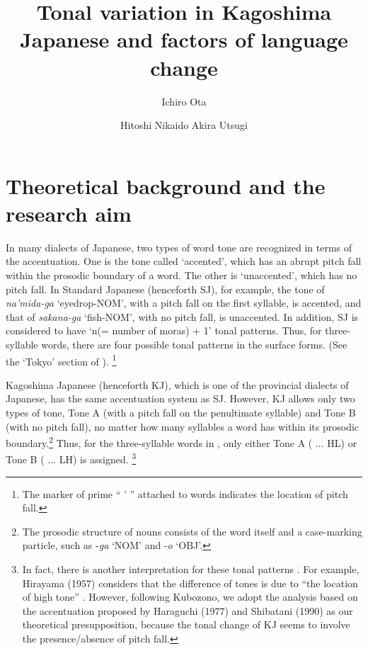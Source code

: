 \documentclass[output=paper]{LSP/langsci}
\author{Ichiro Ota\affiliation{Kagoshima University}\and Hitoshi Nikaido\affiliation{Fukuoka Jo Gakuin University} \lastand Akira Utsugi\affiliation{Nagoya University}}
\title{Tonal variation in {K}agoshima {J}apanese and factors of language change}
\begin{document}
 

\section{Theoretical background and the research aim}
\largerpage[-2]
In many dialects of Japanese, two types of word tone are recognized in terms of the accentuation. One is the tone called `accented', which has an abrupt pitch fall within the prosodic boundary of a word. The other is `unaccented', which has no pitch fall. In Standard Japanese (henceforth SJ), for example, the tone of \textit{na'mida-ga} `eyedrop-NOM', with a pitch fall on the first syllable, is accented, and that of \textit{sakana-ga} `fish-NOM', with no pitch fall, is unaccented. In addition, SJ is considered to have `n(= number of moras) + 1' tonal patterns. Thus, for three-syllable words, there are four possible tonal patterns in the surface forms. (See the `Tokyo' section of ). \footnote{ The marker of prime “ ’ ” attached to words indicates the location of pitch fall.}
 

Kagoshima Japanese (henceforth KJ), which is one of the provincial dialects of Japanese, has the same accentuation system as SJ. However, KJ allows only two types of tone, Tone A (with a pitch fall on the penultimate syllable) and Tone B (with no pitch fall), no matter how many syllables a word has within its prosodic boundary.\footnote{ The prosodic structure of nouns consists of the word itself and a case-marking particle, such as -\textit{ga} `NOM' and -\textit{o} `OBJ'.} Thus, for the three-syllable words in , only either Tone A ( ... HL) or Tone B ( ... LH) is assigned. \footnote{ In fact, there is another interpretation for these tonal patterns \citep{kubozono_tonal_2007}. For example, Hirayama (1957) %
considers that the difference of tones is due to ``the location of high tone'' \citep[327]{kubozono_tonal_2007}. However, following Kubozono, we adopt the analysis based on the accentuation proposed by Haraguchi (1977) and Shibatani (1990) %
as our theoretical presupposition, because the tonal change of KJ seems to involve the presence/absence of pitch fall.  
} 
 
\end{document}
